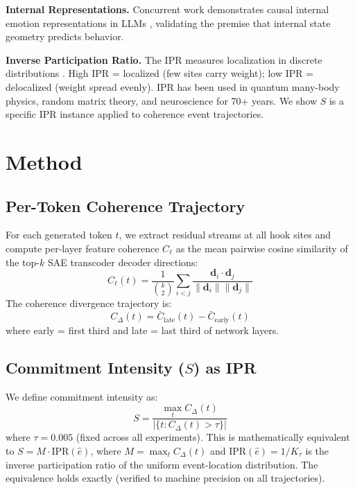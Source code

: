 \documentclass{article}
\begin{document}
\textbf{Internal Representations.}
Concurrent work demonstrates causal internal emotion representations
in LLMs \citep{anthropic2026emotion}, validating the premise that
internal state geometry predicts behavior.

\textbf{Inverse Participation Ratio.}
The IPR measures localization in discrete distributions
\citep{anderson1958absence}. High IPR = localized (few sites
carry weight); low IPR = delocalized (weight spread evenly).
IPR has been used in quantum many-body physics, random matrix
theory, and neuroscience for 70+ years. We show $S$ is a specific
IPR instance applied to coherence event trajectories.

\section{Method}

\subsection{Per-Token Coherence Trajectory}

For each generated token $t$, we extract residual streams at all
hook sites and compute per-layer feature coherence $C_\ell$ as the
mean pairwise cosine similarity of the top-$k$ SAE transcoder decoder
directions:
\begin{equation}
C_\ell(t) = \frac{1}{\binom{k}{2}} \sum_{i<j}
\frac{\mathbf{d}_i \cdot \mathbf{d}_j}{\|\mathbf{d}_i\| \|\mathbf{d}_j\|}
\end{equation}
The coherence divergence trajectory is:
\begin{equation}
C_\Delta(t) = \bar{C}_\text{late}(t) - \bar{C}_\text{early}(t)
\end{equation}
where early = first third and late = last third of network layers.

\subsection{Commitment Intensity ($S$) as IPR}

We define commitment intensity as:
\begin{equation}
S = \frac{\max_t C_\Delta(t)}{|\{t : C_\Delta(t) > \tau\}|}
\end{equation}
where $\tau = 0.005$ (fixed across all experiments). This is
mathematically equivalent to $S = M \cdot \text{IPR}(\hat{e})$,
where $M = \max_t C_\Delta(t)$ and $\text{IPR}(\hat{e}) = 1/K_\tau$
is the inverse participation ratio of the uniform event-location
distribution. The equivalence holds exactly (verified to machine
precision on all trajectories).
\end{document}
